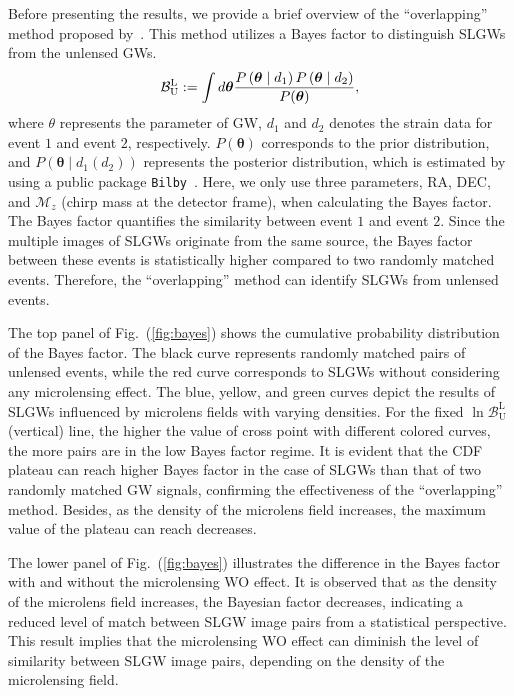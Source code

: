 \documentclass[fleqn,usenatbib]{mnras}
\begin{document}
Before presenting the results, we provide a brief overview of the ``overlapping'' method proposed by~\citet{Haris:2018vmn}.
This method utilizes a Bayes factor to distinguish SLGWs from the unlensed GWs.
\begin{equation}
\mathcal{B}_{\mathrm{U}}^{\mathrm{L}}:=\int d \boldsymbol{\theta} \frac{P\left(\boldsymbol{\theta} \mid d_{1}\right) P\left(\boldsymbol{\theta} \mid d_{2}\right)}{P(\boldsymbol{\theta})} \\,
\end{equation}
where $\theta$ represents the parameter of GW, $d_1$ and $d_2$ denotes the strain data for event $1$ and event $2$, respectively.
$P(\boldsymbol{\theta})$ corresponds to the prior distribution, and $P\left(\boldsymbol{\theta} \mid d_{1} (d_{2})\right)$ represents the posterior distribution, which is estimated by using a public package \texttt{Bilby}~\citep{Ashton:2018jfp}.
Here, we only use three parameters, RA, DEC, and $\mathcal{M}_z$ (chirp mass at the detector frame), when calculating the Bayes factor.
The Bayes factor quantifies the similarity between event $1$ and event $2$.
Since the multiple images of SLGWs originate from the same source, the Bayes factor between these events is statistically higher compared to two randomly matched events.
Therefore, the ``overlapping'' method can identify SLGWs from unlensed events.


The top panel of Fig.~(\ref{fig:bayes}) shows the cumulative probability distribution of the Bayes factor.
The black curve represents randomly matched pairs of unlensed events, while the red curve corresponds to SLGWs without considering any microlensing effect. 
The blue, yellow, and green curves depict the results of SLGWs influenced by microlens fields with varying densities.
For the fixed $\ln \mathcal{B}_{\mathrm{U}}^{\mathrm{L}}$ (vertical) line, the higher the value of cross point with different colored curves, the more pairs are in the low Bayes factor regime.  
It is evident that the CDF plateau can reach higher Bayes factor in the case of SLGWs than that of two randomly matched GW signals, confirming the effectiveness of the ``overlapping'' method. Besides, as the density of the microlens field increases, the maximum value of the plateau can reach decreases.

The lower panel of Fig.~(\ref{fig:bayes}) illustrates the difference in the Bayes factor with and without the microlensing WO effect.
It is observed that as the density of the microlens field increases, the Bayesian factor decreases, indicating a reduced level of match between SLGW image pairs from a statistical perspective.
This result implies that the microlensing WO effect can diminish the level of similarity between SLGW image pairs, depending on the density of the microlensing field.
\end{document}
